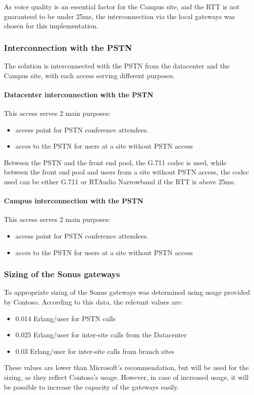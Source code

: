 	As voice quality is an essential factor for the Campus site, and the RTT is not guaranteed to be under 25ms, the interconnection via the local gateways was chosen for this implementation.
	
	
\subsubsection{Interconnection with the PSTN}

	The solution is interconnected with the PSTN from the datacenter and the Campus site, with each access serving different purposes.
	
	\paragraph{Datacenter interconnection with the PSTN}
	This access serves 2 main purposes:
	\begin{itemize}
		\item access point for PSTN conference attendees.
		\item acces to the PSTN for users at a site without PSTN access
	\end{itemize}
	
	Between the PSTN and the front end pool, the G.711 codec is used, while between the front end pool and users from a site without PSTN access, the codec used can be either G.711 or RTAudio Narrowband if the RTT is above 25ms.
		
	
	\paragraph{Campus interconnection with the PSTN}
	This access serves 2 main purposes:
	\begin{itemize}
		\item access point for PSTN conference attendees.
		\item acces to the PSTN for users at a site without PSTN access
	\end{itemize}
		

	
\subsubsection{Sizing of the Sonus gateways}
	To appropriate sizing of the Sonus gateways was determined using usage provided by Contoso. According to this data, the relevant values are: 
	\begin{itemize}
		\item 0.014 Erlang/user for PSTN calls
		\item 0.025 Erlang/user for inter-site calls from the Datacenter
		\item 0.03 Erlang/user for inter-site calls from branch sites
	\end{itemize}
	These values are lower than Microsoft's recommendation, but will be used for the sizing, as they reflect Contoso's usage. However, in case of increased usage, it will be possible to increase the capacity of the gateways easily.
	
